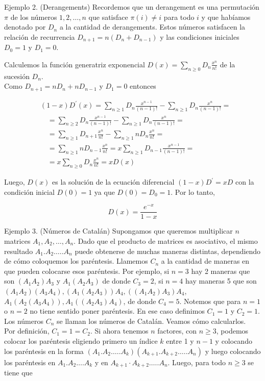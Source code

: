 \documentclass[10pt]{article}
\begin{document}
Ejemplo 2. (Derangements) Recordemos que un derangement es una permutación $\pi$ de los números $1,2, \ldots, n$ que satisface $\pi(i) \neq i$ para todo $i$ y que habíamos denotado por $D_{n}$ a la cantidad de derangements. Estos números satisfacen la relación de recurrencia $D_{n+1}=n\left(D_{n}+D_{n-1}\right)$ y las condiciones iniciales $D_{0}=1$ y $D_{1}=0$.

Calculemos la función generatriz exponencial $D(x)=\sum_{n \geq 0} D_{n} \frac{x^{n}}{n!}$ de la sucesión $D_{n}$.\\
Como $D_{n+1}=n D_{n}+n D_{n-1}$ y $D_{1}=0$ entonces

$$
\begin{aligned}
& (1-x) D^{\prime}(x)=\sum_{n \geq 1} D_{n} \frac{x^{n-1}}{(n-1)!}-\sum_{n \geq 1} D_{n} \frac{x^{n}}{(n-1)!}= \\
& \quad=\sum_{n \geq 2} D_{n} \frac{x^{n-1}}{(n-1)!}-\sum_{n \geq 1} D_{n} \frac{x^{n}}{(n-1)!}= \\
& \quad=\sum_{n \geq 1} D_{n+1} \frac{x^{n}}{n!}-\sum_{n \geq 1} n D_{n} \frac{x^{n}}{n!}= \\
& \quad=\sum_{n \geq 1} n D_{n-1} \frac{x^{n}}{n!}=x \sum_{n \geq 1} D_{n-1} \frac{x^{n-1}}{(n-1)!}= \\
& \quad=x \sum_{n \geq 0} D_{n} \frac{x^{n}}{n!}=x D(x)
\end{aligned}
$$

Luego, $D(x)$ es la solución de la ecuación diferencial $(1-x) D^{\prime}=x D$ con la condición inicial $D(0)=1$ ya que $D(0)=D_{0}=1$. Por lo tanto,

$$
D(x)=\frac{e^{-x}}{1-x}
$$

Ejemplo 3. (Números de Catalán) Supongamos que queremos multiplicar $n$ matrices $A_{1}, A_{2}, \ldots, A_{n}$. Dado que el producto de matrices es asociativo, el mismo resultado $A_{1} . A_{2} \ldots . . A_{n}$ puede obtenerse de muchas maneras distintas, dependiendo de cómo coloquemos los paréntesis. Llamemos $C_{n}$ a la cantidad de maneras en que pueden colocarse esos paréntesis. Por ejemplo, si $n=3$ hay 2 maneras que son $\left(A_{1} A_{2}\right) A_{3}$ y $A_{1}\left(A_{2} A_{3}\right)$ de donde $C_{3}=2$, si $n=4$ hay maneras 5 que son $\left(A_{1} A_{2}\right)\left(A_{3} A_{4}\right),\left(A_{1}\left(A_{2} A_{3}\right)\right) A_{4},\left(\left(A_{1} A_{2}\right) A_{3}\right) A_{4}$, $A_{1}\left(A_{2}\left(A_{3} A_{4}\right)\right), A_{1}\left(\left(A_{2} A_{3}\right) A_{4}\right)$, de donde $C_{4}=5$. Notemos que para $n=1$ o $n=2$ no tiene sentido poner paréntesis. En ese caso definimos $C_{1}=1$ y $C_{2}=1$.\\
Los números $C_{n}$ se llaman los números de Catalán. Veamos cómo calcularlos.\\
Por definición, $C_{1}=1=C_{2}$. Si ahora tenemos $n$ factores, con $n \geq 3$, podemos colocar los paréntesis eligiendo primero un índice $k$ entre 1 y $n-1$ y colocando los paréntesis en la forma $\left(A_{1} . A_{2} \ldots . . A_{k}\right)\left(A_{k+1} . A_{k+2} \ldots . . A_{n}\right)$ y luego colocando los paréntesis en $A_{1} . A_{2} \ldots . A_{k}$ y en $A_{k+1} \cdot A_{k+2} \ldots . . A_{n}$. Luego, para todo $n \geq 3$ se tiene que
\end{document}

